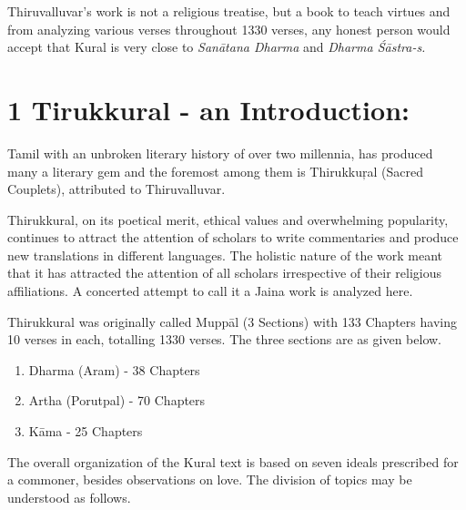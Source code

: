 Thiruvalluvar’s work is not a religious treatise, but a book to teach virtues and from analyzing various verses throughout 1330 verses, any honest person would accept that Kural is very close to \textit{Sanātana Dharma} and \textit{Dharma Śāstra-s.}


\section*{1 Tirukkural - an Introduction:}

Tamil with an unbroken literary history of over two millennia, has produced many a literary gem and the foremost among them is Thirukkuŗal (Sacred Couplets), attributed to Thiruvalluvar.

Thirukkural, on its poetical merit, ethical values and overwhelming popularity, continues to attract the attention of scholars to write commentaries and produce new translations in different languages. The holistic nature of the work meant that it has attracted the attention of all scholars irrespective of their religious affiliations. A concerted attempt to call it a Jaina work is analyzed here.

Thirukkural was originally called Muppāl (3 Sections) with 133 Chapters having 10 verses in each, totalling 1330 verses. The three sections are as given below.

\begin{enumerate}[{\rm 1)}]
\itemsep=0pt
\item Dharma (Aram) - 38 Chapters

 \item Artha (Porutpal) - 70 Chapters

 \item Kāma - 25 Chapters

\end{enumerate}

\newpage

The overall organization of the Kural text is based on seven ideals prescribed for a commoner, besides observations on love. The division of topics may be understood as follows.

